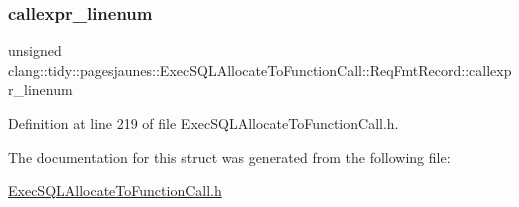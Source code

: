 \subsubsection{\texorpdfstring{callexpr\+\_\+linenum}{callexpr\_linenum}}
{\footnotesize\ttfamily unsigned clang\+::tidy\+::pagesjaunes\+::\+Exec\+S\+Q\+L\+Allocate\+To\+Function\+Call\+::\+Req\+Fmt\+Record\+::callexpr\+\_\+linenum}



Definition at line 219 of file Exec\+S\+Q\+L\+Allocate\+To\+Function\+Call.\+h.



The documentation for this struct was generated from the following file\+:\begin{DoxyCompactItemize}
\item 
\hyperlink{_exec_s_q_l_allocate_to_function_call_8h}{Exec\+S\+Q\+L\+Allocate\+To\+Function\+Call.\+h}\end{DoxyCompactItemize}
